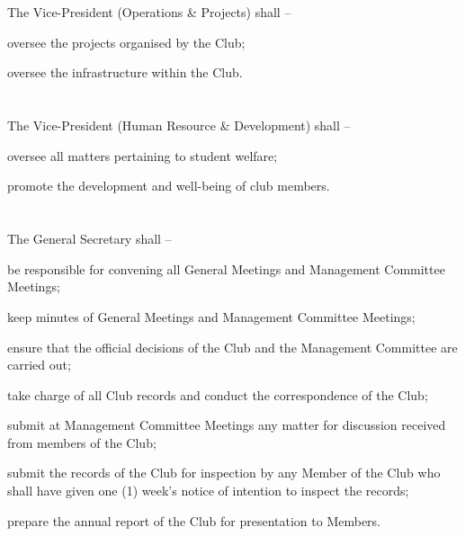 \section{}
The Vice-President (Operations \& Projects) shall –
	\begin{legal}
	\item oversee the projects organised by the Club;
	\item oversee the infrastructure within the Club.
	\end{legal}

\section{}
The Vice-President (Human Resource \& Development) shall –
	\begin{legal}
	\item oversee all matters pertaining to student welfare;
	\item promote the development and well-being of club members.
	\end{legal}

\section{}
The General Secretary shall –
	\begin{legal}
	\item be responsible for convening all General Meetings and Management Committee Meetings;
	\item keep minutes of General Meetings and Management Committee Meetings;
	\item ensure that the official decisions of the Club and the Management Committee are carried out;
	\item take charge of all Club records and conduct the correspondence of the Club;
	\item submit at Management Committee Meetings any matter for discussion received from members of the Club;
	\item submit the records of the Club for inspection by any Member of the Club who shall have given one (1) week's notice of intention to inspect the records;
	\item prepare the annual report of the Club for presentation to Members.
	\end{legal}

